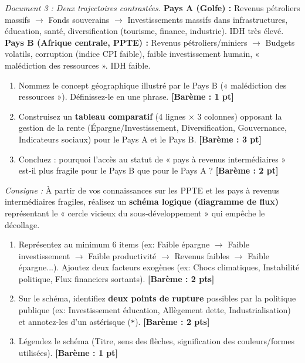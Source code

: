 \documentclass[11pt]{article}
\begin{document}
\begin{exercice}
\emph{Document 3 : Deux trajectoires contrastées.}
\textbf{Pays A (Golfe) :} Revenus pétroliers massifs $\rightarrow$ Fonds souverains $\rightarrow$ Investissements massifs dans infrastructures, éducation, santé, diversification (tourisme, finance, industrie). IDH très élevé.
\textbf{Pays B (Afrique centrale, PPTE) :} Revenus pétroliers/miniers $\rightarrow$ Budgets volatils, corruption (indice CPI faible), faible investissement humain, « malédiction des ressources ». IDH faible.

\providecommand{\barème}[1]{\textbf{[Barème : #1 pt]}}
\begin{enumerate}
    \item Nommez le concept géographique illustré par le Pays B (« malédiction des ressources »). Définissez-le en une phrase. \barème{1}
    \item Construisez un \textbf{tableau comparatif} (4 lignes × 3 colonnes) opposant la gestion de la rente (Épargne/Investissement, Diversification, Gouvernance, Indicateurs sociaux) pour le Pays A et le Pays B. \barème{3}
    \item Concluez : pourquoi l'accès au statut de « pays à revenus intermédiaires » est-il plus fragile pour le Pays B que pour le Pays A ? \barème{2}
\end{enumerate}
\end{exercice}

\begin{exercice}
\emph{Consigne :} À partir de vos connaissances sur les PPTE et les pays à revenus intermédiaires fragiles, réalisez un \textbf{schéma logique (diagramme de flux)} représentant le « cercle vicieux du sous-développement » qui empêche le décollage.

\begin{enumerate}
    \item Représentez au minimum 6 items (ex: Faible épargne $\rightarrow$ Faible investissement $\rightarrow$ Faible productivité $\rightarrow$ Revenus faibles $\rightarrow$ Faible épargne...). Ajoutez deux facteurs exogènes (ex: Chocs climatiques, Instabilité politique, Flux financiers sortants). \hfill\textbf{[Barème : 2 pts]}
    \item Sur le schéma, identifiez \textbf{deux points de rupture} possibles par la politique publique (ex: Investissement éducation, Allègement dette, Industrialisation) et annotez-les d'un astérisque (\texttt{*}). \hfill\textbf{[Barème : 2 pts]}
    \item Légendez le schéma (Titre, sens des flèches, signification des couleurs/formes utilisées). \hfill\textbf{[Barème : 1 pt]}
\end{enumerate}
\end{exercice}
\end{document}

